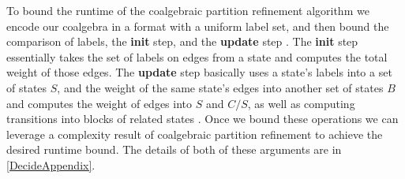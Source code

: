 \documentclass[a4paper,UKenglish,cleveref, autoref, thm-restate]{lipics-v2021}
\theoremstyle{plain}\newtheoremrep{thm}{Theorem}[section]
\begin{document}
	To bound the runtime of the coalgebraic partition refinement algorithm we encode our coalgebra in a format with a uniform label set, and then bound the comparison of labels, the \textbf{init} step, and the \textbf{update} step \cite{10.1007/978-3-030-30942-8_18}. The \textbf{init} step essentially takes the set of labels on edges from a state and computes the total weight of those edges. The \textbf{update} step basically uses a state's labels into a set of states $S$, and the weight of the same state's edges into another set of states $B$ and computes the weight of edges into $S$ and $C/S$, as well as computing transitions into blocks of related states \cite{10.1007/978-3-030-30942-8_18, dorsch2017efficientcoalgebraicpartitionrefinement}. Once we bound these operations we can leverage a complexity result \cite[Theorem 3.4]{10.1007/978-3-030-30942-8_18} of coalgebraic partition refinement to achieve the desired runtime bound. The details of both of these arguments are in \cref{DecideAppendix}.
	
\end{document}
